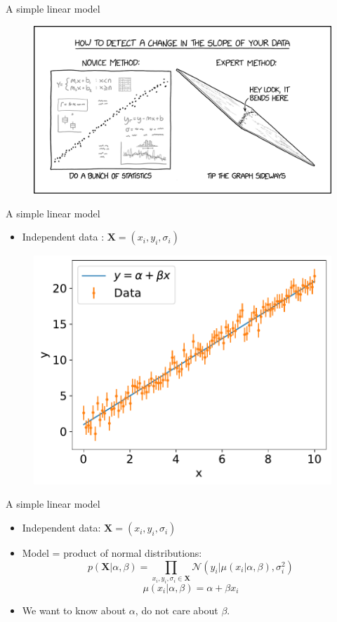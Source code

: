 \documentclass[
aspectratio=169,
14pt,
professionalfonts
]{beamer}
\newcommand{\arrow}{~\ding{220}~}
\begin{document}
\begin{frame}{A simple linear model}
    \begin{figure}
        \centering
        \href{https://xkcd.com/}{
        \includegraphics[width=0.8\linewidth]{../plots/change_in_slope_2x.png}
        }
    \end{figure}
\end{frame}

\begin{frame}{A simple linear model}

    \begin{itemize}
        \item Independent data : $\boldsymbol{X} = (x_i, y_i, \sigma_i)$
    \end{itemize}

    \begin{figure}
        \centering
        \includegraphics[width=0.5\linewidth]{../plots/linear_data.pdf}
    \end{figure}

\end{frame}

\begin{frame}{A simple linear model}
    \begin{itemize}
        \item Independent data: $\boldsymbol{X} = (x_i, y_i, \sigma_i)$
        \item[\arrow] Model = product of normal distributions:
        $$ p(\boldsymbol{X}|\alpha, \beta) = \prod_{x_i, y_i,\sigma_i \in \boldsymbol{X}}\mathcal{N}(y_i | \mu(x_i|\alpha, \beta), \sigma_i^2)$$
        $$\mu(x_i|\alpha, \beta) = \alpha + \beta x_i$$
         \item We want to know about $\alpha$, do not care about $\beta$.
    \end{itemize}
\end{frame}
\end{document}
